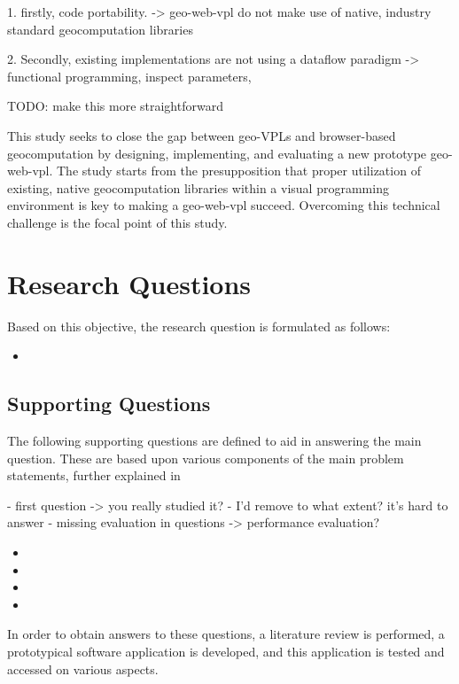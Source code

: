 1. firstly, code portability. 
-> geo-web-vpl do not make use of native, industry standard geocomputation libraries

2. Secondly, existing implementations are not using a dataflow paradigm
-> functional programming, inspect parameters, 

TODO: make this more straightforward

This study seeks to close the gap between geo-VPLs and browser-based geocomputation by designing, implementing, and evaluating a new prototype \ac{geo-web-vpl}.
The study starts from the presupposition that proper utilization of existing, native geocomputation libraries within a visual programming environment is key to making a geo-web-vpl succeed. 
Overcoming this technical challenge is the focal point of this study. 

\section{Research Questions}
Based on this objective, the research question is formulated as follows: 
\begin{itemize}[ ]
  \item \myMainRQ
\end{itemize}

\subsection*{Supporting Questions}
The following supporting questions are defined to aid in answering the main question.
These are based upon various components of the main problem statements, further explained in 

\begin{note}
  - first question -> you really studied it?
  - I'd remove to what extent? it's hard to answer
  - missing evaluation in questions -> performance evaluation?
\end{note}

\begin{itemize}[-]
  \item \mySubRQOne
  \item \mySubRQTwo
  \item \mySubRQThree
  \item \mySubRQFour
\end{itemize}
In order to obtain answers to these questions, a literature review is performed,
a prototypical software application is developed, 
and this application is tested and accessed on various aspects.

